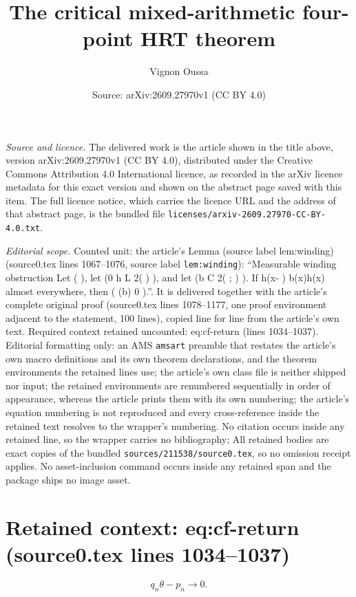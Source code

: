 \documentclass[10pt,a4paper]{amsart}
\title[The critical mixed-arithmetic four-point HRT theorem]{The critical mixed-arithmetic four-point HRT theorem}
\author{Vignon Oussa}
\date{Source: arXiv:2609.27970v1 (CC BY 4.0)}
\theoremstyle{plain}
\theoremstyle{remark}
\begin{document}
\maketitle

\noindent\emph{Source and licence.} The delivered work is the article shown in the title above, version arXiv:2609.27970v1 (CC BY 4.0), distributed under the Creative Commons Attribution 4.0 International licence, as recorded in the arXiv licence metadata for this exact version and shown on the abstract page saved with this item. The full licence notice, which carries the licence URL and the address of that abstract page, is the bundled file \texttt{licenses/arxiv-2609.27970-CC-BY-4.0.txt}.
\par\smallskip

\noindent\textit{Editorial scope.} Counted unit: the article's Lemma (source label lem:winding) (source0.tex lines 1067--1076, source label \texttt{lem:winding}): ``Measurable winding obstruction Let ( ), let (0 h L 2( ) ), and let (b C 2( ; ) ). If h(x- ) b(x)h(x) almost everywhere, then ( (b) 0 ).''. It is delivered together with the article's complete original proof (source0.tex lines 1078--1177, one proof environment adjacent to the statement, 100 lines), copied line for line from the article's own text. Required context retained uncounted: eq:cf-return (lines 1034--1037). Editorial formatting only: an AMS \texttt{amsart} preamble that restates the article's own macro definitions and its own theorem declarations, and the theorem environments the retained lines use; the article's own class file is neither shipped nor input; the retained environments are renumbered sequentially in order of appearance, whereas the article prints them with its own numbering; the article's equation numbering is not reproduced and every cross-reference inside the retained text resolves to the wrapper's numbering. No citation occurs inside any retained line, so the wrapper carries no bibliography; All retained bodies are exact copies of the bundled \texttt{sources/211538/source0.tex}, so no omission receipt applies. No asset-inclusion command occurs inside any retained span and the package ships no image asset.


\section*{Retained context: eq:cf-return (source0.tex lines 1034--1037)}

\begin{equation}
  q_n\theta-p_n\longrightarrow0.
  \label{eq:cf-return}
\end{equation}
\end{document}
